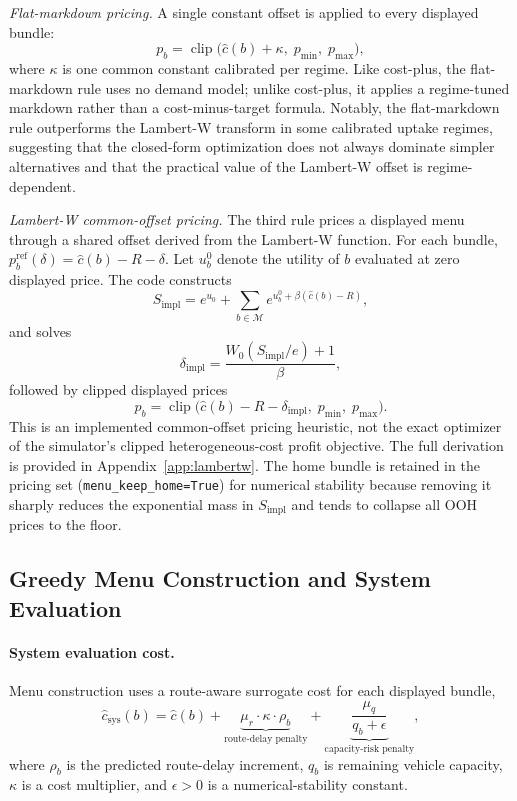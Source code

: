 \emph{Flat-markdown pricing.} A single constant offset is applied to every displayed bundle:
\[
  p_b = \operatorname{clip}\!\bigl(\hat{c}(b) + \kappa,\; p_{\min},\; p_{\max}\bigr),
\]
where $\kappa$ is one common constant calibrated per regime. Like cost-plus, the flat-markdown rule uses no demand model; unlike cost-plus, it applies a regime-tuned markdown rather than a cost-minus-target formula. Notably, the flat-markdown rule outperforms the Lambert-W transform in some calibrated uptake regimes, suggesting that the closed-form optimization does not always dominate simpler alternatives and that the practical value of the Lambert-W offset is regime-dependent.

\emph{Lambert-W common-offset pricing.} The third rule prices a displayed menu through a shared offset derived from the Lambert-W function. For each bundle, $p_b^{\text{ref}}(\delta) = \hat{c}(b) - R - \delta$. Let $u_b^0$ denote the utility of $b$ evaluated at zero displayed price. The code constructs
\[
  S_{\text{impl}} = e^{u_0} + \sum_{b \in \mathcal{M}} e^{u_b^0 + \beta(\hat{c}(b) - R)},
\]
and solves
\begin{equation}
  \delta_{\text{impl}} = \frac{W_0(S_{\text{impl}}/e) + 1}{\beta},
  \label{eq:lambertw}
\end{equation}
followed by clipped displayed prices
\begin{equation}
  p_b = \operatorname{clip}\!\bigl(\hat{c}(b) - R - \delta_{\text{impl}},\; p_{\min},\; p_{\max}\bigr).
  \label{eq:price}
\end{equation}
This is an implemented common-offset pricing heuristic, not the exact optimizer of the simulator's clipped heterogeneous-cost profit objective. The full derivation is provided in Appendix~\ref{app:lambertw}. The home bundle is retained in the pricing set (\texttt{menu\_keep\_home=True}) for numerical stability because removing it sharply reduces the exponential mass in $S_{\text{impl}}$ and tends to collapse all OOH prices to the floor.

\subsection{Greedy Menu Construction and System Evaluation}
\label{sec:scoring}

\paragraph{System evaluation cost.} Menu construction uses a route-aware surrogate cost for each displayed bundle,
\begin{equation}
  \hat{c}_{\text{sys}}(b) = \hat{c}(b)
    + \underbrace{\mu_r \cdot \kappa \cdot \rho_b}_{\text{route-delay penalty}}
    + \underbrace{\frac{\mu_q}{q_b + \epsilon}}_{\text{capacity-risk penalty}},
  \label{eq:syscost}
\end{equation}
where $\rho_b$ is the predicted route-delay increment, $q_b$ is remaining vehicle capacity, $\kappa$ is a cost multiplier, and $\epsilon > 0$ is a numerical-stability constant.

